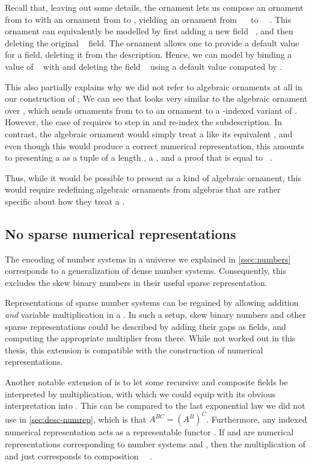 Recall that, leaving out some details, the ornament  lets us compose an ornament from  to  with an ornament from  to , yielding an ornament from \ \  to \ \ . This ornament can equivalently be modelled by first adding a new field \ , and then deleting the original \  field. The ornament  \cite{kophd} allows one to provide a default value for a field, deleting it from the description. Hence, we can model  by binding a value  of \  with  and deleting the field \  using a default value computed by .

This also partially explains why we did not refer to algebraic ornaments at all in our construction of ; We can see that  looks very similar to the algebraic ornament over , which sends ornaments from  to  to an ornament to a -indexed variant of . However, the case of  requires  to step in and re-index the subdescription. In contrast, the algebraic ornament would simply treat a  like its equivalent , and even though this would produce a correct numerical representation, this amounts to presenting a  as a tuple of a length , a  , and a proof that  is equal to \ .

Thus, while it would be possible to present  as a kind of algebraic ornament, this would require redefining algebraic ornaments from algebras that are rather specific about how they treat a .


\subsection{No sparse numerical representations}\label{sec:discussion-no-sparse}
The encoding of number systems in a universe we explained in \autoref{ssec:numbers} corresponds to a generalization of dense number systems. Consequently, this excludes the skew binary numbers \cite{oka95b} in their useful sparse representation.

Representations of sparse number systems can be regained by allowing addition \emph{and} variable multiplication in a . In such a setup, skew binary numbers and other sparse representations could be described by adding their gaps as fields, and computing the appropriate multiplier from there. While not worked out in this thesis, this extension is compatible with the construction of numerical representations.

Another notable extension of  is to let some recursive and composite fields be interpreted by multiplication, with which we could equip  with its obvious interpretation into \bN{}. This can be compared to the last exponential law we did not use in \autoref{sec:desc-numrep}, which is that $A^{BC} = (A^B)^C$. Furthermore, any indexed numerical representation acts as a representable functor . If  and  are numerical representations corresponding to number systems  and , then the multiplication of  and  just corresponds to composition \ \ .
